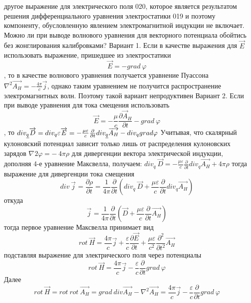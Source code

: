 \documentclass[11pt]{article}
\begin{document}
другое выражение для электрического поля 020, которое является
результатом решения дифференциального уравнения электростатики 019 и
поэтому компоненту, обусловленную явлением электромагнитной индукции не
включает. Можно ли при выводе волнового уравнения для векторного
потенциала обойтись без жонглирования калибровками? Вариант 1. Если в
качестве выражения для \(\overrightarrow{E}\) использовать выражение,
пришедшее из электростатики \[\overrightarrow{E}=-grad\ \varphi \], то в
качестве волнового уравнения получается уравнение Пуассона
\({{\nabla }^{2}}\overrightarrow{{{A}_{H}}}=-\frac{4\pi }{c}\overrightarrow{j}\),
однако таким уравнением не получится распространение электромагнитных
волн. Поэтому такой вариант непродуктивен Вариант 2. Если при выводе
уравнения для тока смещения использовать
\[\overrightarrow{E}=-\frac{\mu }{c}\frac{\partial {{\overrightarrow{A}}_{H}}}{\partial t}-grad\ \varphi \],
то
$div_{\emph{q}} \overrightarrow{D}=di{{v}_{q}} \varepsilon \overrightarrow{E}=-\frac{\mu \varepsilon }{c}\frac{\partial }{\partial t}di{v}_{\emph{q}}\overrightarrow{{{A}_{H}}}-di{{v}_{q}} grad \varphi$
Учитывая, что скалярный кулоновский потенциал зависит только лишь от
распределения кулоновских зарядов
${{\nabla }^{}{2}}\varphi =-~4\pi \rho$ для дивергенции
вектора электрической индукции, дополняя 4-е уравнение Максвелла,
получаем:
$div_q~\overrightarrow{D}=-\frac{\mu \varepsilon }{c}\frac{\partial }{\partial t}div_q\overrightarrow{A_H}+4\pi \rho$
тогда выражение для дивергенции тока смещения
\[div\ {{\overrightarrow{j}}_{}}=\frac{\partial \rho }{\partial t}=\frac{1}{4\pi }\frac{\partial }{\partial t}\left( di{{v}_{q}}\ \overrightarrow{D}+\frac{\mu \varepsilon }{c}\frac{\partial }{\partial t}di{{v}_{q}}\overrightarrow{{{A}_{H}}} \right)\]
откуда
\[{{\overrightarrow{j}}_{}}=\frac{1}{4\pi }\frac{\partial }{\partial t}\left( \overrightarrow{D}+\frac{\mu \varepsilon }{c}\frac{\partial }{\partial t}\overrightarrow{{{A}_{H}}} \right)\]
тогда первое уравнение Максвелла принимает вид
\[rot\ \overrightarrow{H}=\frac{4\pi }{c}\overrightarrow{j}+\frac{\varepsilon }{c}\frac{\partial \overrightarrow{E}}{\partial t}+\frac{\mu \varepsilon }{{{c}^{2}}}\frac{{{\partial }^{2}}}{\partial {{t}^{2}}}\overrightarrow{{{A}_{H}}}\]
подставляя выражение для электрического поля через потенциалы
\[rot\ \overrightarrow{H}=\frac{4\pi }{c}\overrightarrow{j}-\frac{\varepsilon }{c}\frac{\partial }{\partial t}grad\ \varphi \]
Далее
\[rot\ \overrightarrow{H}=rot\ rot\ \overrightarrow{{{A}_{H}}}=grad\ div\overrightarrow{{{A}_{H}}}-{{\nabla }^{2}}\overrightarrow{{{A}_{H}}}=\frac{4\pi }{c}\overrightarrow{j}-\frac{\varepsilon }{c}\frac{\partial }{\partial t}grad\ \varphi \]
\end{document}
